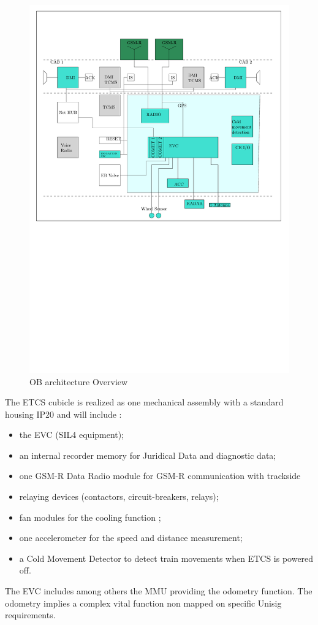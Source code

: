 \documentclass[oneside]{template/openetcs_report}
\begin{document}
\begin{figure}[H]
	\center
	\includegraphics[width=\textwidth]{Arc_over_v1.pdf}
	\caption{OB architecture Overview}\label{Arc_over}
\end{figure}

The ETCS cubicle is realized as one mechanical assembly with a standard housing IP20 and will include :
\begin{itemize} 
	\item the \gls{EVC} (SIL4 equipment);
	\item an internal recorder memory for Juridical Data and diagnostic data;
	\item one GSM-R Data Radio module for GSM-R communication with trackside
	\item relaying devices (contactors, circuit-breakers, relays);
	\item fan modules for the cooling function ;
	\item one accelerometer for the speed and distance measurement; 
	\item a Cold Movement Detector to detect train movements when ETCS is powered off.
\end{itemize}
The \gls{EVC} includes among others the \gls{MMU} providing the odometry function. The odometry implies a complex vital function non mapped on specific Unisig requirements.
\end{document}
